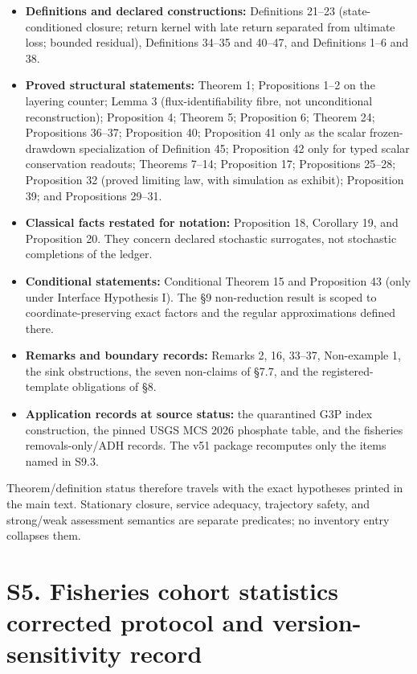 \documentclass[11pt]{article}
\begin{document}
\begin{itemize}\setlength{\itemsep}{2pt}
\item \textbf{Definitions and declared constructions:} Definitions 21--23 (state-conditioned closure; return kernel with late return separated from ultimate loss; bounded residual), Definitions 34--35 and 40--47, and Definitions 1--6 and 38.
\item \textbf{Proved structural statements:} Theorem 1; Propositions 1--2 on the layering counter; Lemma 3 (flux-identifiability fibre, not unconditional reconstruction); Proposition 4; Theorem 5; Proposition 6; Theorem 24; Propositions 36--37; Proposition 40; Proposition 41 only as the scalar frozen-drawdown specialization of Definition 45; Proposition 42 only for typed scalar conservation readouts; Theorems 7--14; Proposition 17; Propositions 25--28; Proposition 32 (proved limiting law, with simulation as exhibit); Proposition 39; and Propositions 29--31.
\item \textbf{Classical facts restated for notation:} Proposition 18, Corollary 19, and Proposition 20. They concern declared stochastic surrogates, not stochastic completions of the ledger.
\item \textbf{Conditional statements:} Conditional Theorem 15 and Proposition 43 (only under Interface Hypothesis I). The \S9 non-reduction result is scoped to coordinate-preserving exact factors and the regular approximations defined there.
\item \textbf{Remarks and boundary records:} Remarks 2, 16, 33--37, Non-example 1, the sink obstructions, the seven non-claims of \S7.7, and the registered-template obligations of \S8.
\item \textbf{Application records at source status:} the quarantined G3P index construction, the pinned USGS MCS 2026 phosphate table, and the fisheries removals-only/ADH records. The v51 package recomputes only the items named in S9.3.
\end{itemize}

Theorem/definition status therefore travels with the exact hypotheses printed in the main text. Stationary closure, service adequacy, trajectory safety, and strong/weak assessment semantics are separate predicates; no inventory entry collapses them.

\vspace{0.8em}

\section*{S5. Fisheries cohort statistics  corrected protocol and version-sensitivity record}\label{s5-fisheries-cohort-statistics-corrected-protocol-and-version-sensitiv}
\end{document}
